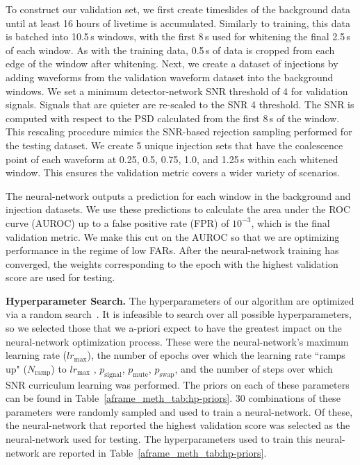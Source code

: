 \begin{refsection}
To construct our validation set, we first create timeslides of the background data until at least 16 hours of livetime is accumulated. 
Similarly to training, this data is batched into 10.5\,s windows, with the first 8\,s used for whitening the final 2.5\,s of each window. 
As with the training data, 0.5\,s of data is cropped from each edge of the window after whitening.
Next, we create a dataset of injections by adding waveforms from the validation waveform dataset into the background windows. 
We set a minimum detector-network SNR threshold of 4 for validation signals. 
Signals that are quieter are re-scaled to the SNR 4 threshold. 
The SNR is computed with respect to the PSD calculated from the first 8\,s of the window. 
This rescaling procedure mimics the SNR-based rejection sampling performed for the testing dataset. 
We create 5 unique injection sets that have the coalescence point of each waveform at 0.25, 0.5, 0.75, 1.0, and 1.25\,s within each whitened window. 
This ensures the validation metric covers a wider variety of scenarios. 

The neural-network outputs a prediction for each window in the background and injection datasets. 
We use these predictions to calculate the area under the ROC curve (AUROC) up to a false positive rate (FPR) of $10^{-3}$, which is the final validation metric. 
We make this cut on the AUROC so that we are optimizing performance in the regime of low FARs. 
After the neural-network training has converged, the weights corresponding to the epoch with the highest validation score are used for testing.


\textbf{Hyperparameter Search.} \label{aframe_meth_sec:hp-search}
The hyperparameters of our algorithm are optimized via a random search~\cite{random_search}. 
It is infeasible to search over all possible hyperparameters, so we selected those that we a-priori expect to have the greatest impact on the neural-network optimization process.
These were the neural-network's maximum learning rate ($lr_{\text{max}}$), the number of epochs over which the learning rate ``ramps up" ($N_{\text{ramp}}$) to $lr_{\text{max}}$ , $p_{\text{signal}}$, $p_{\text{mute}}$, $p_{\text{swap}}$, and the number of steps over which SNR curriculum learning was performed. 
The priors on each of these parameters can be found in Table~\ref{aframe_meth_tab:hp-priors}.
30 combinations of these parameters were randomly sampled and used to train a neural-network.
Of these, the neural-network that reported the highest validation score was selected as the neural-network used for testing. 
The hyperparameters used to train this neural-network are reported in Table~\ref{aframe_meth_tab:hp-priors}.


\end{refsection}
